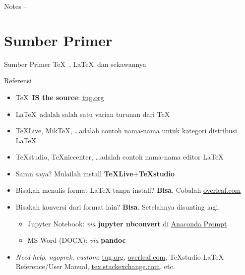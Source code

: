 \documentclass[11pt,            %
               aspectratio=169, %
               xcolor=svgnames,
               t                %
               ]{beamer}
\begin{document}
\begin{frame}{Notes}
\label{notes}
--
\end{frame}

\begin{frame}{\contentsname}
\label{contents}
\tableofcontents
{}
\end{frame}

\section{Sumber Primer}

\begin{frame}{Sumber Primer \TeX\ , \LaTeX\ dan sekawannya}
\begin{block}{Referensi}
\begin{itemize}
\item \TeX\ \textbf{IS the source}: \href{https://tug.org/}{tug.org}
\item \LaTeX\ adalah salah satu varian turunan dari \TeX
\item TeXLive, MikTeX, \ldots adalah contoh nama-nama untuk kategori distribusi \LaTeX
\item TeXstudio, TeXniccenter, \ldots adalah contoh nama-nama editor \LaTeX
\item Saran saya? Mulailah install \textbf{TeXLive}$+$\textbf{TeXstudio}
\item Bisakah menulis format LaTeX tanpa install? \textbf{Bisa}. Cobalah \href{https://www.overleaf.com}{overleaf.com}
\item Bisakah konversi dari format lain? \textbf{Bisa}. Setelahnya disunting lagi.
\begin{itemize}
    \item Jupyter Notebook: \textit{via} \textbf{jupyter nbconvert} di \underline{Anaconda Prompt}
    \item MS Word (DOCX): \textit{via} \textbf{pandoc}
\end{itemize}
\item \textit{Need help}, \textit{ngoprek}, \textit{custom}: \href{https://tug.org/}{tug.org}, \href{https://www.overleaf.com}{overleaf.com}, TeXstudio LaTeX Reference/User Manual, \href{https://tex.stackexchange.com/}{tex.stackexchange.com}, etc.
\end{itemize}
\end{block}
\end{frame}
\end{document}
